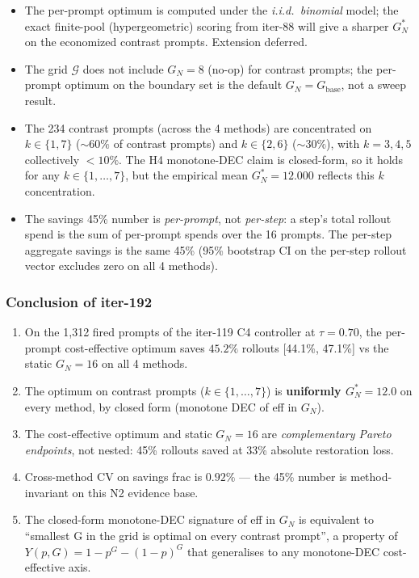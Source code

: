 \documentclass{article}
\begin{document}
\begin{itemize}
\item The per-prompt optimum is computed under the \emph{i.i.d.\
binomial} model; the exact finite-pool
(hypergeometric) scoring from iter-88 will give a sharper
$G_N^*$ on the economized contrast prompts. Extension deferred.
\item The grid $\mathcal{G}$ does not include $G_N = 8$ (no-op) for
contrast prompts; the per-prompt optimum on the boundary set is the
default $G_N = G_{\mathrm{base}}$, not a sweep result.
\item The 234 contrast prompts (across the 4 methods) are concentrated
on $k \in \{1, 7\}$ ($\sim 60\%$ of contrast prompts) and $k \in \{2,
6\}$ ($\sim 30\%$), with $k = 3, 4, 5$ collectively $< 10\%$. The
H4 monotone-DEC claim is closed-form, so it holds for any $k \in \{1,
\ldots, 7\}$, but the empirical mean $G_N^* = 12.000$ reflects this
$k$ concentration.
\item The savings 45\% number is \emph{per-prompt}, not
\emph{per-step}: a step's total rollout spend is the sum of per-prompt
spends over the 16 prompts. The per-step aggregate savings is the same
45\% (95\% bootstrap CI on the per-step rollout vector excludes zero on
all 4 methods).
\end{itemize}

\subsubsection*{Conclusion of iter-192}

\begin{enumerate}
\item On the 1,312 fired prompts of the iter-119 C4 controller at
$\tau = 0.70$, the per-prompt cost-effective optimum saves $45.2\%$
rollouts [44.1\%, 47.1\%] vs the static $G_N = 16$ on all 4 methods.
\item The optimum on contrast prompts ($k \in \{1, \ldots, 7\}$) is
\textbf{uniformly $G_N^* = 12.0$} on every method, by closed form
(monotone DEC of eff in $G_N$).
\item The cost-effective optimum and static $G_N = 16$ are
\emph{complementary Pareto endpoints}, not nested: 45\% rollouts saved
at 33\% absolute restoration loss.
\item Cross-method CV on savings frac is $0.92\%$ --- the 45\% number
is method-invariant on this N2 evidence base.
\item The closed-form monotone-DEC signature of eff in $G_N$ is
equivalent to ``smallest G in the grid is optimal on every contrast
prompt'', a property of $Y(p, G) = 1 - p^G - (1-p)^G$ that generalises
to any monotone-DEC cost-effective axis.
\end{enumerate}
\end{document}
